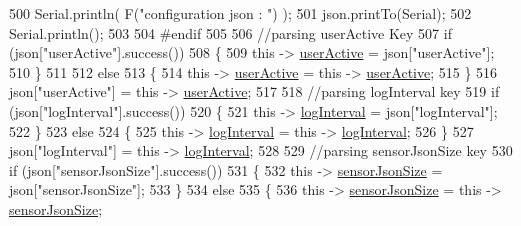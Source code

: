 \begin{DoxyCode}
500             Serial.println( F(\textcolor{stringliteral}{"configuration json : "}) );
501             json.printTo(Serial);
502             Serial.println();
503         
504 \textcolor{preprocessor}{        #endif}
505             
506             \textcolor{comment}{//parsing userActive Key}
507             \textcolor{keywordflow}{if} (json[\textcolor{stringliteral}{"userActive"}].success())
508             \{
509                 \textcolor{keyword}{this} -> \hyperlink{classCoolBoard_a6395459131d6889a3005f79c7a35e964}{userActive} = json[\textcolor{stringliteral}{"userActive"}];
510             \}
511 
512             \textcolor{keywordflow}{else}
513             \{
514                 \textcolor{keyword}{this} -> \hyperlink{classCoolBoard_a6395459131d6889a3005f79c7a35e964}{userActive} = \textcolor{keyword}{this} -> \hyperlink{classCoolBoard_a6395459131d6889a3005f79c7a35e964}{userActive};
515             \}
516             json[\textcolor{stringliteral}{"userActive"}] = \textcolor{keyword}{this} -> \hyperlink{classCoolBoard_a6395459131d6889a3005f79c7a35e964}{userActive};
517 
518             \textcolor{comment}{//parsing logInterval key}
519             \textcolor{keywordflow}{if} (json[\textcolor{stringliteral}{"logInterval"}].success())
520             \{
521                 \textcolor{keyword}{this} -> \hyperlink{classCoolBoard_a4de0096d575d66b472c4c1f0111fd452}{logInterval} = json[\textcolor{stringliteral}{"logInterval"}];
522             \}
523             \textcolor{keywordflow}{else}
524             \{
525                 \textcolor{keyword}{this} -> \hyperlink{classCoolBoard_a4de0096d575d66b472c4c1f0111fd452}{logInterval} = \textcolor{keyword}{this} -> \hyperlink{classCoolBoard_a4de0096d575d66b472c4c1f0111fd452}{logInterval};
526             \}
527             json[\textcolor{stringliteral}{"logInterval"}] = \textcolor{keyword}{this} -> \hyperlink{classCoolBoard_a4de0096d575d66b472c4c1f0111fd452}{logInterval};
528 
529             \textcolor{comment}{//parsing sensorJsonSize key}
530             \textcolor{keywordflow}{if} (json[\textcolor{stringliteral}{"sensorJsonSize"}].success())
531             \{
532                 \textcolor{keyword}{this} -> \hyperlink{classCoolBoard_a58e4b6072e3ac8b141ec0befb479208e}{sensorJsonSize} = json[\textcolor{stringliteral}{"sensorJsonSize"}];
533             \}
534             \textcolor{keywordflow}{else}
535             \{
536                 \textcolor{keyword}{this} -> \hyperlink{classCoolBoard_a58e4b6072e3ac8b141ec0befb479208e}{sensorJsonSize} = \textcolor{keyword}{this} -> \hyperlink{classCoolBoard_a58e4b6072e3ac8b141ec0befb479208e}{sensorJsonSize};

\end{DoxyCode}
